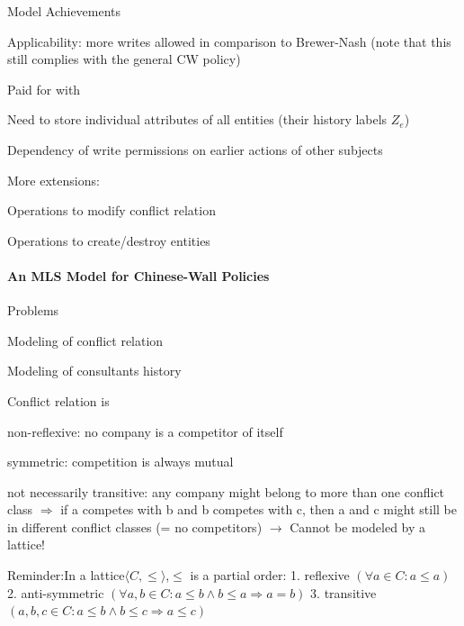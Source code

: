 \documentclass[a4paper]{article}
\begin{document}
\begin{multicols}{3}
    Model Achievements
    \begin{itemize*}
        \item Applicability: more writes allowed in comparison to Brewer-Nash (note that this still complies with the general CW policy)
        \item Paid for with
        \begin{itemize*}
            \item Need to store individual attributes of all entities (their history labels $Z_e$)
            \item Dependency of write permissions on earlier actions of other subjects
        \end{itemize*}
        \item More extensions:
        \begin{itemize*}
            \item Operations to modify conflict relation
            \item Operations to create/destroy entities
        \end{itemize*}
    \end{itemize*}

    \paragraph{An MLS Model for Chinese-Wall Policies}
    Problems
    \begin{itemize*}
        \item Modeling of conflict relation
        \item Modeling of consultants history
    \end{itemize*}

    Conflict relation is
    \begin{itemize*}
        \item non-reflexive: no company is a competitor of itself
        \item symmetric: competition is always mutual
        \item not necessarily transitive: any company might belong to more than one conflict class $\Rightarrow$ if a competes with b and b competes with c, then a and c might still be in different conflict classes (= no competitors) $\rightarrow$ Cannot be modeled by a lattice!
    \end{itemize*}

    Reminder:In a lattice$⟨C,\leq⟩$,$\leq$ is a partial order:
    1. reflexive $(\forall a\in C:a \leq a)$
    2. anti-symmetric $(\forall a,b \in C:a \leq b \wedge b \leq a\Rightarrow a=b)$
    3. transitive $(a,b,c \in C:a \leq b \wedge b \leq c \Rightarrow a \leq c)$


\end{multicols}
\end{document}
